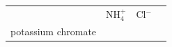 \begin{enumerate}[noitemsep, label=\textbf{\arabic*}. ]
{\begin{tabular}[t]{|l|l|l|l|}
    
         &
    
    
        \begin{math}\mathrm{NH}_{4}^{+}\end{math} &
    
    
        \begin{math}\mathrm{Cl}{}^{-}\end{math} &
    
    
     \tabularnewline\cline{1-1}\cline{2-2}\cline{3-3}\cline{4-4}
    
    
        potassium chromate &
    
    
         &
    
    
         &
    
    
     \tabularnewline\cline{1-1}\cline{2-2}\cline{3-3}\cline{4-4}
    

\end{tabular}}
\end{enumerate}
